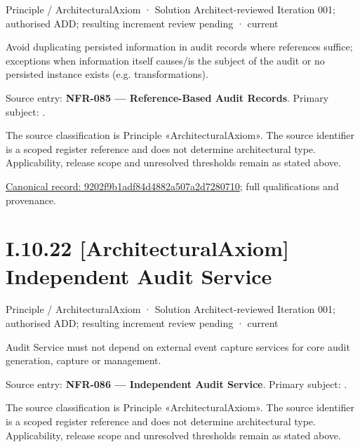 \label{element:9202f9b1adf84d4882a507a2d7280710}
{\small Principle / ArchitecturalAxiom · Solution Architect-reviewed Iteration 001; authorised ADD; resulting increment review pending · current}\par

Avoid duplicating persisted information in audit records where references suffice; exceptions when information itself causes/is the subject of the audit or no persisted instance exists (e.g. transformations).



Source entry: \textbf{NFR-085 — Reference-Based Audit Records}. Primary subject: \texttt{}.



The source classification is Principle «ArchitecturalAxiom». The source identifier is a scoped register reference and does not determine architectural type. Applicability, release scope and unresolved thresholds remain as stated above.


{\footnotesize \href{../../../../../../../continuum/motivation/principle/architectural-axiom/9202f9b1adf84d4882a507a2d7280710.md}{Canonical record: 9202f9b1adf84d4882a507a2d7280710}; full qualifications and provenance.}\par
\section*{I.10.22 [ArchitecturalAxiom] Independent Audit Service}
\label{navigation:I.10.22}

\label{element:41fa01556ade4f22a35288b072113767}
{\small Principle / ArchitecturalAxiom · Solution Architect-reviewed Iteration 001; authorised ADD; resulting increment review pending · current}\par

Audit Service must not depend on external event capture services for core audit generation, capture or management.



Source entry: \textbf{NFR-086 — Independent Audit Service}. Primary subject: \texttt{}.



The source classification is Principle «ArchitecturalAxiom». The source identifier is a scoped register reference and does not determine architectural type. Applicability, release scope and unresolved thresholds remain as stated above.


